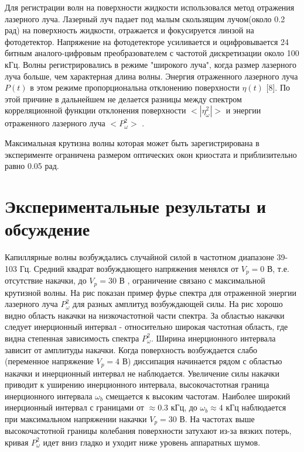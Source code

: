 	Для регистрации волн на поверхности жидкости использовался метод отражения лазерного луча. Лазерный луч падает под малым скользящим лучом(около 0.2 рад) на поверхность жидкости, отражается и фокусируется линзой на фотодетектор. Напряжение на фотодетекторе усиливается и оцифровывается 24 битным аналого-цифровым преобразователем с частотой дискретизации около 100 кГц. Волны регистрировались в режиме "широкого луча", когда размер лазерного луча больше, чем характерная длина волны. Энергия отраженного лазерного луча $P(t)$  в этом режиме пропорциональна отклонению поверхности $\eta(t)$ [8]. По этой причине в дальнейшем не делается разницы между спектром корреляционной функции отклонения поверхности $<|\eta_\omega^2|>$ и энергии отраженного лазерного луча $<P_\omega^2>$ .

	Максимальная крутизна волны которая может быть зарегистрирована в эксперименте ограничена размером оптических окон криостата и приблизительно равно 0.05 рад.

\section{Экспериментальные результаты и обсуждение} %
 Капиллярные волны возбуждались случайной силой в частотном диапазоне 39-103 Гц. Средний квадрат возбуждающего напряжения менялся от $V_p = 0$ В, т.е. отсутствие накачки, до $V_p = 30$ В , ограничение связано с максимальной крутизной волны. На рис показан пример фурье спектра для отраженной энергии лазерного луча $P_\omega^2$ для разных амплитуд возбуждающей силы. На рис хорошо видно область накачки на низкочастотной части спектра. За областью накачки следует инерционный интервал - относительно широкая частотная область, где видна степенная зависимость спектра $P_\omega^2$. Ширина инерционного интервала зависит от амплитуды накачки. Когда поверхность возбуждается слабо (переменное напряжение $V_p = 4$ В) диссипация начинается рядом с областью накачки и инерционный интервал не наблюдается. Увеличение силы накачки приводит к уширению инерционного интервала, высокочастотная граница инерционного интервала $\omega_b$ смещается к высоким частотам. Наиболее широкий инерционный интервал с границами от $\approx 0.3$ кГц, до $\omega_b \approx 4$ кГц наблюдается при максимальном напряжении накачки $V_p = 30$ В. На частотах выше высокочастотной границы колебания поверхности затухают из-за вязких потерь, кривая $P_\omega^2$ идет вниз гладко и уходит ниже уровень аппаратных шумов.

